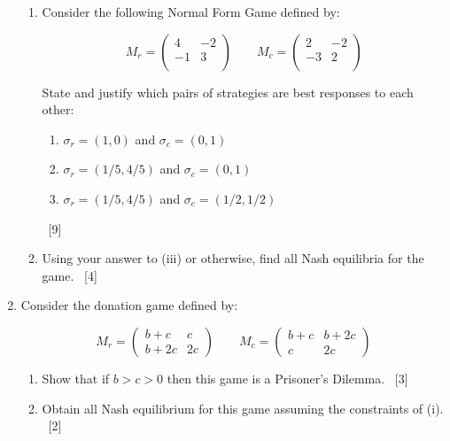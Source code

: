 \documentclass[12pt,a4paper]{article}
\begin{document}
\begin{enumerate}
\begin{enumerate}
        \item Consider the following Normal Form Game defined by:

            \[
                M_r=
\begin{pmatrix}
4 & -2 \\
-1 & 3 \\
\end{pmatrix}
\qquad
            M_c=
\begin{pmatrix}
2 & -2 \\
-3 & 2 \\
\end{pmatrix}
\]

        State and justify which pairs of strategies are best responses to each
            other:
            \begin{enumerate}
                \item \(\sigma_r=(1, 0)\) and \(\sigma_c=(0, 1)\)
                \item \(\sigma_r=(1/5, 4/5)\) and \(\sigma_c=(0, 1)\)
                \item \(\sigma_r=(1/5, 4/5)\) and \(\sigma_c=(1/2, 1/2)\)
            \end{enumerate}
            ~\hfill{[9]}


        \item Using your answer to (iii) or otherwise, find all Nash equilibria
            for the game.
            ~\hfill{[4]}
        
    \end{enumerate}

\newpage

\item
    Consider the donation game defined by:

    \[
        M_r = 
        \begin{pmatrix}    
            b + c & c\\
            b + 2 c    & 2 c
        \end{pmatrix}
        \qquad
        M_c = 
        \begin{pmatrix}    
            b + c & b + 2c\\
            c    & 2 c
        \end{pmatrix}
    \]


    \begin{enumerate}
        \item Show that if \(b>c>0\) then this game is a Prisoner's Dilemma.
            ~\hfill{[3]}
    \item Obtain all Nash equilibrium for this game assuming the constraints of
        (i).
            ~\hfill{[2]}


\end{enumerate}
\end{enumerate}
\end{document}

